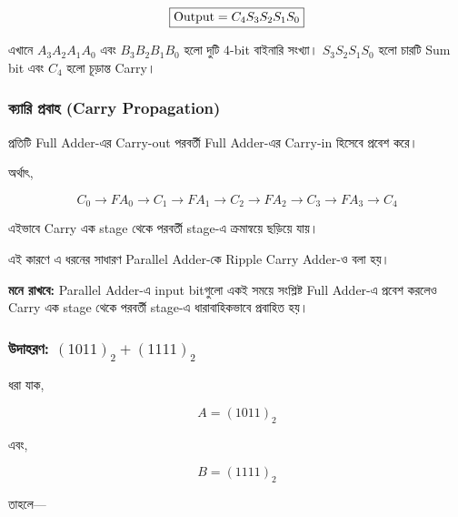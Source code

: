 \[
\boxed{
\text{\textenglish{Output}}
=
C_4S_3S_2S_1S_0
}
\]

এখানে \(A_3A_2A_1A_0\) এবং \(B_3B_2B_1B_0\) হলো দুটি
\(4\)-\textenglish{bit} বাইনারি সংখ্যা।
\(S_3S_2S_1S_0\) হলো চারটি \textenglish{Sum bit}
এবং \(C_4\) হলো চূড়ান্ত \textenglish{Carry}।



\subsubsection*{ক্যারি প্রবাহ
(\textenglish{Carry Propagation})}

প্রতিটি \textenglish{Full Adder}-এর \textenglish{Carry-out}
পরবর্তী \textenglish{Full Adder}-এর \textenglish{Carry-in}
হিসেবে প্রবেশ করে।

অর্থাৎ,

\[
C_0
\rightarrow
FA_0
\rightarrow
C_1
\rightarrow
FA_1
\rightarrow
C_2
\rightarrow
FA_2
\rightarrow
C_3
\rightarrow
FA_3
\rightarrow
C_4
\]

এইভাবে \textenglish{Carry} এক \textenglish{stage} থেকে
পরবর্তী \textenglish{stage}-এ ক্রমান্বয়ে ছড়িয়ে যায়।

এই কারণে এ ধরনের সাধারণ \textenglish{Parallel Adder}-কে
\textenglish{Ripple Carry Adder}-ও বলা হয়।

\par\begingroup

\textbf{মনে রাখবে:}
\textenglish{Parallel Adder}-এ \textenglish{input bit}গুলো একই সময়ে
সংশ্লিষ্ট \textenglish{Full Adder}-এ প্রবেশ করলেও
\textenglish{Carry} এক \textenglish{stage} থেকে পরবর্তী
\textenglish{stage}-এ ধারাবাহিকভাবে প্রবাহিত হয়।
\par\endgroup




\subsubsection*{উদাহরণ:
\((1011)_2+(1111)_2\)}

ধরা যাক,

\[
A=(1011)_2
\]

এবং,

\[
B=(1111)_2
\]

তাহলে—

